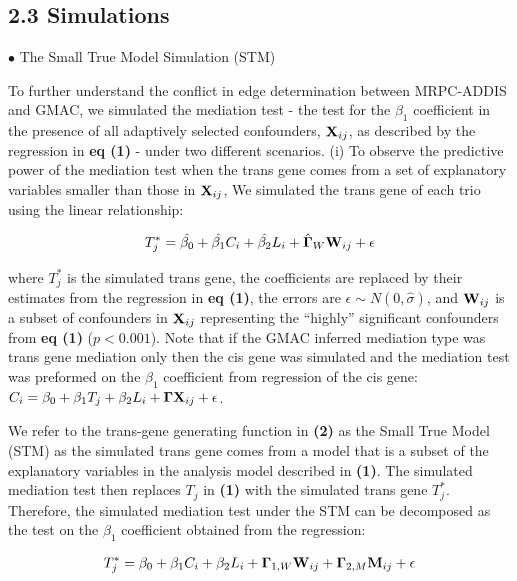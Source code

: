 \documentclass[
]{article}
\begin{document}
\subsection*{2.3 Simulations}

\indent \(\bullet\) The Small True Model Simulation (STM)

To further understand the conflict in edge determination between
MRPC-ADDIS and GMAC, we simulated the mediation test - the test for the
\(\beta_1\) coefficient in the presence of all adaptively selected
confounders, \({\bf X}_{ij}\), as described by the regression in
\textbf{eq (1)} - under two different scenarios. (i) To observe the
predictive power of the mediation test when the trans gene comes from a
set of explanatory variables smaller than those in \({\bf X}_{ij}\), We
simulated the trans gene of each trio using the linear relationship:

\begin{eqnarray} T^{\ast}_{j} = \hat{\beta_0}+\hat{\beta_1}C_i + \hat{\beta_2}L_i + \hat{{\bf\Gamma}}_W {\bf W}_{ij} +\epsilon  \end{eqnarray}

where \(T^{\ast}_{j}\) is the simulated trans gene, the coefficients are
replaced by their estimates from the regression in \textbf{eq (1)}, the
errors are \(\epsilon \sim N(0, \hat{\sigma})\), and \({\bf W}_{ij}\) is
a subset of confounders in \({\bf X}_{ij}\) representing the ``highly''
significant confounders from \textbf{eq (1)} (\(p<0.001\)). Note that if
the GMAC inferred mediation type was trans gene mediation only then the
cis gene was simulated and the mediation test was preformed on the
\(\beta_1\) coefficient from regression of the cis gene:
\(C_i = \beta_0 + \beta_1T_j + \beta_2L_i + {\bf \Gamma X}_{ij}+\epsilon\).

We refer to the trans-gene generating function in \textbf{(2)} as the
Small True Model (STM) as the simulated trans gene comes from a model
that is a subset of the explanatory variables in the analysis model
described in \textbf{(1)}. The simulated mediation test then replaces
\(T_j\) in \textbf{(1)} with the simulated trans gene \(T^{\ast}_j\).
Therefore, the simulated mediation test under the STM can be decomposed
as the test on the \(\beta_1\) coefficient obtained from the regression:

\begin{eqnarray} T^{\ast}_{j} = \beta_0+\beta_1C_i + \beta_2L_i + {\bf\Gamma}_{1,W} {\bf W}_{ij} + {\bf \Gamma}_{2,M}{\bf M}_{ij} +\epsilon \end{eqnarray}
\end{document}
